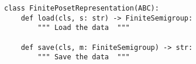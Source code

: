 \begin{verbatim}
class FinitePosetRepresentation(ABC):
    def load(cls, s: str) -> FiniteSemigroup:
        """ Load the data  """

    def save(cls, m: FiniteSemigroup) -> str:
        """ Save the data  """
\end{verbatim}